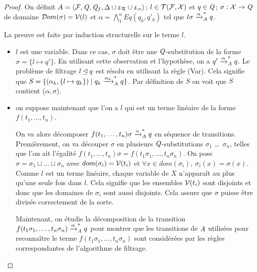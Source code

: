 \begin{proof}

  On définit $A = \langle \mathcal{F}, \mathit Q, \mathit Q_f, \Delta \cup \upvarepsilon_{\mathcal R} \cup \upvarepsilon_{=}\rangle$;
  $l \in \mathcal{T(F, X)}$ et $q \in \mathit Q$; $\sigma : \mathcal X \rightarrow \mathit Q$ de domaine $\mathcal{D}om(\sigma) = \mathcal V(l)$ et $\alpha = \bigwedge_1^n Eq(q_k,q'_k)$ tel que $l\sigma \xrightarrow{\alpha}^*_\mathit A q$.

  \medskip
  \noindent
  La preuve est faite par induction structurelle sur le terme $l$.

  \medskip
  \noindent
  \begin{itemize}
  \item $l$ est une variable.
    Dans ce cas, $\sigma$ doit être une $\mathit Q$-substitution de la forme $\sigma =\{ l \mapsto q' \}$.
    En utilisant cette observation et l'hypothèse, on a $q' \xrightarrow{\alpha}^*_\mathit A q$.
    Le problème de filtrage $l \unlhd q$ est résolu en utilisant la règle (Var).
    Cela signifie que $S = \{(\alpha_k, \{l \mapsto q_k\}) \; | \; q_k \xrightarrow{\alpha_k}^*_\mathit A q\}$.
    Par définition de $S$ on voit que $S$ contient ($\alpha, \sigma$).
    \medskip
  \item
  on suppose maintenant que l'on a $l$ qui est un terme linéaire de la forme $f(t_1,\dots, t_n)$.

  On va alors décomposer $f(t_1,\dots, t_n)\sigma \xrightarrow{\alpha}_\mathit A^* q$ en séquence de transitions.
  Premièrement, on va découper $\sigma$ en plusieurs $\mathit Q$-substitutions $\sigma_1$ \dots\ $\sigma_n$, telles que 
  l'on ait l'égalité $f(t_1,\dots, t_n)\sigma = f(t_1\sigma_1, \dots,t_n\sigma_n)$.
  On pose $\sigma = \sigma_1 \sqcup \dots \sqcup \sigma_n$ avec $dom(\sigma_i) = \mathcal V(t_i)$ et
  $\forall x \in dom(\sigma_i),\ \sigma_i(x) = \sigma(x)$.
  Comme $l$ est un terme linéaire, chaque variable de $X$ n'apparaît au plus qu'une seule fois dans $l$.
  Cela signifie que les ensembles $\mathcal V(t_i)$ sont disjoints et donc que les domaines de $\sigma_i$ sont aussi disjoints.
  Cela assure que $\sigma$ puisse être divisée correctement de la sorte.


  Maintenant, on étudie la décomposition de la transition $f(t_1\sigma_1,\dots, t_n\sigma_n) \xrightarrow{\alpha}_\mathit A^* q$ pour montrer que les transitions de $\mathit A$ utilisées
  pour reconnaître le terme $f(t_1\sigma_1,\dots, t_n\sigma_n)$ sont considérées par les règles correspondantes de l'algorithme de filtrage.


\end{itemize}
\end{proof}

